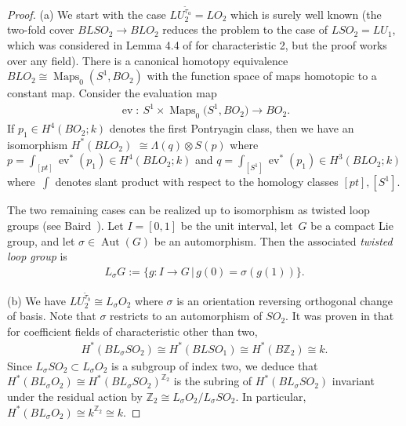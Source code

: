 \documentclass[pdftex]{sigma}
\numberwithin{equation}{section}
\begin{document}
\begin{proof}
(a) We start with the case $LU_2^{{\tilde{\tau}}_a} = LO_2$ which is surely well known (the two-fold cover $BLSO_2 \rightarrow BLO_2$ reduces the problem to the case of $LSO_2 = LU_1$, which was considered in Lemma 4.4 of \cite{B} for characteristic 2, but the proof works over any f\/ield). There is a canonical homotopy equivalence
$BLO_2 \cong \operatorname{Maps}_0(S^1, BO_2)$ with the function space of maps homotopic to a constant map. Consider the evaluation map
\begin{gather*}\operatorname{ev}\colon \ S^1 \times \operatorname{Maps}_0\big(S^1, BO_2\big) \rightarrow BO_2.\end{gather*}
If $p_1\in H^4(BO_2;k)$ denotes the f\/irst Pontryagin class, then we have an isomorphism $ H^*(BLO_2)$ $\cong \Lambda(q) \otimes S(p)$ where $p = \int_{[pt]} \operatorname{ev}^*(p_1) \in H^4(BLO_2; k)$ and $q = \int_{[S^1]}\operatorname{ev}^*(p_1) \in H^3(BLO_2;k)$ where~$\int$ denotes slant product with respect to the homology classes $[pt], [S^1]$.

The two remaining cases can be realized up to isomorphism as twisted loop groups (see Baird~\cite{B2}). Let $I=[0,1]$ be the unit interval, let~$G$ be a compact Lie group, and let $\sigma \in \operatorname{Aut}(G)$ be an automorphism. Then the associated \emph{twisted loop group} is
\begin{gather*} L_{\sigma}G := \{ g\colon I \rightarrow G\,|\, g(0) = \sigma(g(1))\}. \end{gather*}

(b) We have $LU_2^{{\tilde{\tau}}_b} \cong L_{\sigma}O_2$ where $\sigma$ is an orientation reversing orthogonal change of basis. Note that $\sigma$ restricts to an automorphism of $SO_2$. It was proven in \cite[Proposition~7.6]{B2} that for coef\/f\/icient f\/ields of characteristic other than two, \begin{gather*}H^*(BL_{\sigma}SO_2) \cong H^*(BLSO_1) \cong H^*(B{\mathbb Z}_2) \cong k.\end{gather*}
 Since $L_{\sigma}SO_2 \subset L_{\sigma} O_2$ is a subgroup of index two, we deduce that $H^*(BL_{\sigma}O_2) \cong H^*(BL_{\sigma}SO_2)^{{\mathbb Z}_2}$ is the subring of $H^*(BL_{\sigma}SO_2)$ invariant under the residual action by ${\mathbb Z}_2 \cong L_{\sigma}O_2 /L_{\sigma}SO_2$. In particular, $H^*(BL_{\sigma}O_2) \cong k^{{\mathbb Z}_2} \cong k$.


\end{proof}
\end{document}
